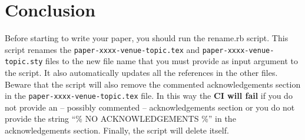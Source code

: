 \documentclass[final,5pt,times,twocolumn]{elsarticle}
\begin{document}
    \section{Conclusion}\label{sec:conclusion}
    Before starting to write your paper, you should run the rename.rb script.
    This script renames the \texttt{paper-xxxx-venue-topic.tex} and \texttt{paper-xxxx-venue-topic.sty} files to the new file name that you must provide as input argument to the script.
    It also automatically updates all the references in the other files.
    Beware that the script will also remove the commented acknowledgements section in the \texttt{paper-xxxx-venue-topic.tex} file.
    In this way the \textbf{CI will fail} if you do not provide an -- possibly commented -- acknowledgements section or you do not provide the string ``\% NO ACKNOWLEDGEMENTS \%'' in the acknowledgements section.
    Finally, the script will delete itself.


    \nocite{*}
    
    

    
\end{document}
